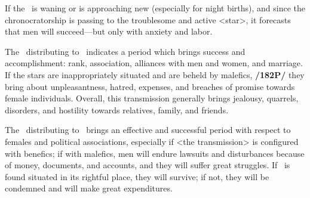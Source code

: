 If the \Moon\, is waning or is approaching new (especially for night births), and since the chronocratorship is passing to the troublesome and active <star>, it forecasts that men will succeed—but only with anxiety and labor.

The \Moon\, distributing to \Venus\, indicates a period which brings success and accomplishment: rank,
association, alliances with men and women, and marriage. If the stars are inappropriately situated and are beheld by malefics, \textbf{/182P/} they bring about unpleasantness, hatred, expenses, and breaches of promise towards female individuals. 
Overall, this transmission generally brings jealousy, quarrels, disorders, and hostility towards relatives, family, and friends.

The \Moon\, distributing to \Mercury\, brings an effective and successful period with respect to females and
political associations, especially if <the transmission> is configured with benefics; if with malefics, men will endure lawsuits and disturbances because of money, documents, and accounts, and they will suffer great struggles. If \Mercury\, is found situated in its rightful place, they will survive; if not, they will be condemned and will make great expenditures.

\newpage